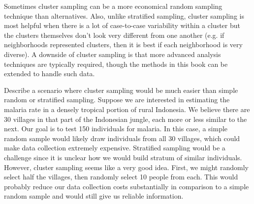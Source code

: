 Sometimes cluster sampling can be a more economical random sampling technique than alternatives. Also, unlike stratified sampling, cluster sampling is most helpful when there is a lot of case-to-case variability within a cluster but the clusters themselves don't look very different from one another (e.g. if neighborhoods represented clusters, then it is best if each neighborhood is very diverse). A downside of cluster sampling is that more advanced analysis techniques are typically required, though the methods in this book can be extended to handle such data.

\begin{example}{Describe a scenario where cluster sampling would be much easier than simple random or stratified sampling.}
Suppose we are interested in estimating the malaria rate in a densely tropical portion of rural Indonesia. We believe there are 30 villages in that part of the Indonesian jungle, each more or less similar to the next. Our goal is to test 150 individuals for malaria. In this case, a simple random sample would likely draw individuals from all 30 villages, which could make data collection extremely expensive. Stratified sampling would be a challenge since it is unclear how we would build stratum of similar individuals. However, cluster sampling seems like a very good idea. First, we might randomly select half the villages, then randomly select 10 people from each. This would probably reduce our data collection costs substantially in comparison to a simple random sample and would still give us reliable information.


\end{example}


